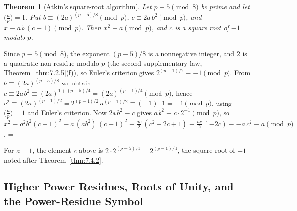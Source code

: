 \documentclass[11pt]{article}
\makeatletter
\theoremstyle{ntstyle}
\newtheorem{theorem}{Theorem}[subsection]
\let\nt@closedisplay\]
\def\nt@guardedclose{\@ifnextchar\par{\nt@closeafterpar}{\@ifnextchar\end{\postdisplaypenalty\@M\nt@closedisplay}{\nt@closedisplay}}}
\def\nt@closeafterpar\par{\@ifnextchar\par{\nt@closeafterpar}{\@ifnextchar\end{\postdisplaypenalty\@M\nt@closedisplay\par}{\nt@closedisplay\par}}}
\renewenvironment{proof}[1][\proofname]{\par
  \pushQED{\qed}\normalfont\topsep\medskipamount\edef\nt@afterproof{\@endparpenalty=\the\@endparpenalty\relax}\@beginparpenalty\@M\@endparpenalty\@M\let\]\nt@guardedclose\trivlist\item[]\textit{#1\@addpunct{.}} \ignorespaces}{\ifvmode\addpenalty\@M\fi\popQED\nt@afterproof\endtrivlist\@endpefalse}
\newcommand{\legs}[2]{\bigl(\tfrac{#1}{#2}\bigr)}
\makeatother
\begin{document}
\begin{theorem}[Atkin's square-root algorithm]\label{thm:7.6.8} Let $p \equiv 5 \pmod{8}$ be prime and
	let $\legs{a}{p} = 1$. Put $b \equiv (2a)^{(p-5)/8} \pmod{p}$, $c \equiv 2a\,b^2 \pmod{p}$, and $x
	\equiv a\,b\,(c-1) \pmod{p}$.
	Then $x^2 \equiv a \pmod{p}$, and $c$ is a square root of $-1$ modulo $p$.
\end{theorem}

\begin{proof} Since $p \equiv 5 \pmod{8}$, the exponent
	$(p-5)/8$ is a nonnegative integer, and $2$ is a quadratic
	non-residue modulo $p$ (the second supplementary law, Theorem~\ref{thm:7.2.5}(f)), so Euler's
	criterion gives $2^{(p-1)/2} \equiv -1 \pmod{p}$. From $b \equiv
		(2a)^{(p-5)/8}$ we obtain $c \equiv 2a\,b^2 \equiv (2a)^{1 + (p-5)/4}
		= (2a)^{(p-1)/4} \pmod{p}$, hence $c^2 \equiv (2a)^{(p-1)/2} =
		2^{(p-1)/2}\,a^{(p-1)/2} \equiv (-1)\cdot 1 = -1 \pmod{p}$, using
	$\legs{a}{p} = 1$ and Euler's criterion. Now $2a\,b^2
		\equiv c$ gives $a\,b^2 \equiv c\cdot 2^{-1} \pmod{p}$, so $x^2 \equiv
		a^2 b^2 (c-1)^2 \equiv a\,(a b^2)\,(c-1)^2 \equiv \tfrac{a
			c}{2}\,(c^2 - 2c + 1) \equiv \tfrac{a c}{2}\,(-2c) \equiv -a\,c^2
		\equiv a \pmod{p}$.
\end{proof}

For $a=1$, the element $c$ above is $2\cdot2^{(p-5)/4}=2^{(p-1)/4}$, the square root of $-1$
noted after Theorem~\ref{thm:7.4.2}.

\subsection{Higher Power Residues, Roots of Unity, and the Power-Residue Symbol}
\end{document}
